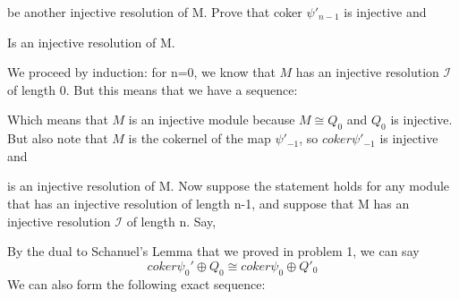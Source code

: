 \documentclass{article}
\begin{document}
be another injective resolution of M.  
Prove that coker ${\psi'_{n-1}}$ is injective and
\begin{center}
\end{center}
Is an injective resolution of M.
\proof

We proceed by induction:
for n=0, we know that $M$ has an injective resolution $\mathscr{I}$ of length 0.  But this means that we have a sequence:
Which means that $M$ is an injective module because $M\cong Q_0$ and $Q_0$ is injective.
\newline
But also note that $M$ is the cokernel of the map ${\psi'_{-1}}$, so $coker{\psi'_{-1}}$ is injective and 
\newline
{}
\newline
is an injective resolution of M.
\newline
Now suppose the statement holds for any module that has an injective resolution of length n-1, and suppose that M has an injective resolution $\mathscr{I}$ of length n. Say,
\begin{center}
\end{center}
By the dual to Schanuel's Lemma that we proved in problem 1, we can say $$coker{\psi_0}' \oplus Q_0 \cong coker{\psi_0} \oplus Q'_0$$
We can also form the following exact sequence:
\begin{center}
\end{center}
\end{document}

